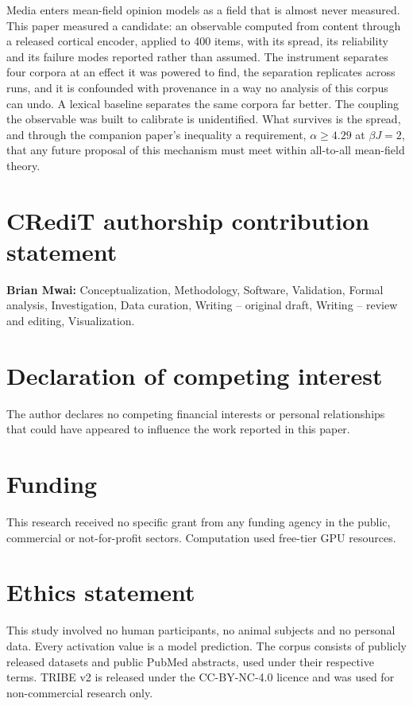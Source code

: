 \documentclass[preprint,12pt]{elsarticle}
\newif\ifcoauthor
\newcommand{\Theauthors}{\ifcoauthor The authors\else The author\fi}
\newcommand{\declare}{\ifcoauthor declare\else declares\fi}
\begin{document}
Media enters mean-field opinion models as a field that is almost never measured. This paper
measured a candidate: an observable computed from content through a released cortical
encoder, applied to 400 items, with its spread, its reliability and its failure modes
reported rather than assumed. The instrument separates four corpora at an effect it was
powered to find, the separation replicates across runs, and it is confounded with provenance
in a way no analysis of this corpus can undo. A lexical baseline separates the same corpora
far better. The coupling the observable was built to calibrate is unidentified. What survives
is the spread, and through the companion paper's inequality a requirement,
$\alpha \ge 4.29$ at $\beta J = 2$, that any future proposal of this mechanism must meet
within all-to-all mean-field theory.

\section*{CRediT authorship contribution statement}

\textbf{Brian Mwai:} Conceptualization, Methodology, Software, Validation, Formal analysis,
Investigation, Data curation, Writing -- original draft, Writing -- review and editing,
Visualization.
\ifcoauthor
\textbf{Songa Mutambi:} Conceptualization (form of the observable), Supervision, Writing --
review and editing.
\fi

\section*{Declaration of competing interest}

\Theauthors{} \declare{} no competing financial interests or personal relationships that could
have appeared to influence the work reported in this paper.

\section*{Funding}

This research received no specific grant from any funding agency in the public, commercial or
not-for-profit sectors. Computation used free-tier GPU resources.

\section*{Ethics statement}

This study involved no human participants, no animal subjects and no personal data. Every
activation value is a model prediction. The corpus consists of publicly released datasets and
public PubMed abstracts, used under their respective terms. TRIBE v2 is released under the
CC-BY-NC-4.0 licence and was used for non-commercial research only.
\end{document}
